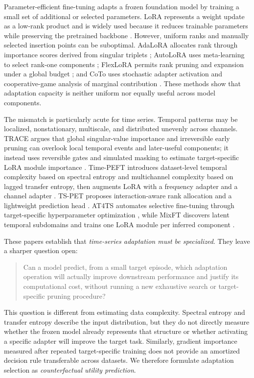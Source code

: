\documentclass[10pt]{article}
\begin{document}
Parameter-efficient fine-tuning adapts a frozen foundation model by training a small set of additional or selected parameters. LoRA represents a weight update as a low-rank product and is widely used because it reduces trainable parameters while preserving the pretrained backbone \citep{hu2022lora}. However, uniform ranks and manually selected insertion points can be suboptimal. AdaLoRA allocates rank through importance scores derived from singular triplets \citep{zhang2023adalora}; AutoLoRA uses meta-learning to select rank-one components \citep{zhang2024autolora}; FlexLoRA permits rank pruning and expansion under a global budget \citep{liu2026flexlora}; and CoTo uses stochastic adapter activation and cooperative-game analysis of marginal contribution \citep{zhuang2025coto}. These methods show that adaptation capacity is neither uniform nor equally useful across model components.

The mismatch is particularly acute for time series. Temporal patterns may be localized, nonstationary, multiscale, and distributed unevenly across channels. TRACE argues that global singular-value importance and irreversible early pruning can overlook local temporal events and later-useful components; it instead uses reversible gates and simulated masking to estimate target-specific LoRA module importance \citep{li2026trace}. Time-PEFT introduces dataset-level temporal complexity based on spectral entropy and multichannel complexity based on lagged transfer entropy, then augments LoRA with a frequency adapter and a channel adapter \citep{na2026timepeft}. TS-PET proposes interaction-aware rank allocation and a lightweight prediction head \citep{zheng2026tspet}. AT4TS automates selective fine-tuning through target-specific hyperparameter optimization \citep{tomar2025at4ts}, while MixFT discovers latent temporal subdomains and trains one LoRA module per inferred component \citep{lee2026mixft}.

These papers establish that \emph{time-series adaptation must be specialized}. They leave a sharper question open:

\begin{quote}
Can a model predict, from a small target episode, which adaptation operation will actually improve downstream performance and justify its computational cost, without running a new exhaustive search or target-specific pruning procedure?
\end{quote}

This question is different from estimating data complexity. Spectral entropy and transfer entropy describe the input distribution, but they do not directly measure whether the frozen model already represents that structure or whether activating a specific adapter will improve the target task. Similarly, gradient importance measured after repeated target-specific training does not provide an amortized decision rule transferable across datasets. We therefore formulate adaptation selection as \emph{counterfactual utility prediction}.
\end{document}
